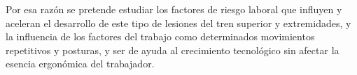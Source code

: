 
Por esa razón se pretende estudiar los factores de riesgo laboral que influyen y aceleran el desarrollo de este tipo de lesiones del tren superior y extremidades, y la influencia de los factores del trabajo como determinados movimientos repetitivos y posturas, y ser de ayuda al crecimiento tecnológico sin afectar la esencia ergonómica del trabajador. 
